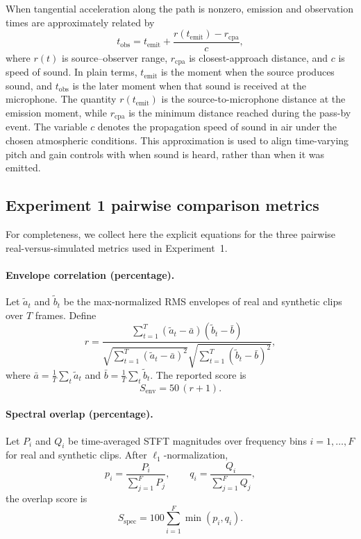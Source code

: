 \documentclass{article}
\begin{document}
When tangential acceleration along the path is nonzero, emission and observation times are approximately related by
\begin{equation}
  t_{\mathrm{obs}} = t_{\mathrm{emit}} + \frac{r(t_{\mathrm{emit}}) - r_{\mathrm{cpa}}}{c},
  \label{eq:retarded-time-approx}
\end{equation}
where $r(t)$ is source--observer range, $r_{\mathrm{cpa}}$ is closest-approach distance, and $c$ is speed of sound.
In plain terms, $t_{\mathrm{emit}}$ is the moment when the source produces sound, and $t_{\mathrm{obs}}$ is the later moment when that sound is received at the microphone. The quantity $r(t_{\mathrm{emit}})$ is the source-to-microphone distance at the emission moment, while $r_{\mathrm{cpa}}$ is the minimum distance reached during the pass-by event. The variable $c$ denotes the propagation speed of sound in air under the chosen atmospheric conditions. This approximation is used to align time-varying pitch and gain controls with when sound is heard, rather than when it was emitted.

\subsection{Experiment 1 pairwise comparison metrics}
\label{supp:exp1-metrics}

For completeness, we collect here the explicit equations for the three pairwise real-versus-simulated metrics used in Experiment~1.

\paragraph{Envelope correlation (percentage).}
Let \(\tilde{a}_t\) and \(\tilde{b}_t\) be the max-normalized RMS envelopes of real and synthetic clips over \(T\) frames. Define
\begin{equation}
  r=\frac{\sum_{t=1}^{T}\left(\tilde{a}_t-\bar a\right)\left(\tilde{b}_t-\bar b\right)}
  {\sqrt{\sum_{t=1}^{T}\left(\tilde{a}_t-\bar a\right)^2}\sqrt{\sum_{t=1}^{T}\left(\tilde{b}_t-\bar b\right)^2}},
\end{equation}
where \(\bar a=\frac{1}{T}\sum_t \tilde{a}_t\) and \(\bar b=\frac{1}{T}\sum_t \tilde{b}_t\). The reported score is
\begin{equation}
  S_{\mathrm{env}}=50\,(r+1).
\end{equation}

\paragraph{Spectral overlap (percentage).}
Let \(P_i\) and \(Q_i\) be time-averaged STFT magnitudes over frequency bins \(i=1,\dots,F\) for real and synthetic clips. After \(\ell_1\)-normalization,
\begin{equation}
  p_i=\frac{P_i}{\sum_{j=1}^{F}P_j},
  \qquad
  q_i=\frac{Q_i}{\sum_{j=1}^{F}Q_j},
\end{equation}
the overlap score is
\begin{equation}
  S_{\mathrm{spec}}=100\sum_{i=1}^{F}\min(p_i,q_i).
\end{equation}
\end{document}
